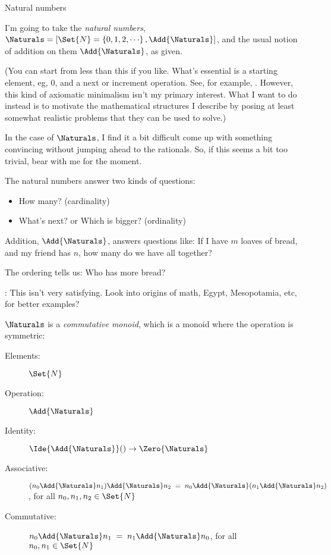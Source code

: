 \documentclass[12pt]{PalisadesLakesBook}
\begin{document}
\begin{plSection}{Natural numbers}

I'm going to take the \emph{natural numbers},
$\Naturals =
 [ \Set{N}=\left\{ 0, 1, 2, {\cdots}\right\}, \Add{\Naturals}]$,
and the usual notion of addition on them $\Add{\Naturals}$,
as given.

(You can start from less than this if you like.
What's essential is a starting element, eg, $0$,
and a {\pseudocodeFont next}
or {\pseudocodeFont increment} operation. 
See, for example, 
.
However, this kind of axiomatic minimalism 
isn't my primary interest.
What I want to do instead is to motivate the mathematical
structures I describe by posing at least somewhat realistic
problems that they can be used to solve.)

In the case of $\Naturals$, I find it a bit difficult 
come up with something convincing without
jumping ahead to the rationals.
So, if this seems a bit too trivial,
 bear with me for the moment.

The natural numbers answer two kinds of questions:
\begin{itemize}
\item How many? (cardinality)
\item What's next? or Which is bigger? (ordinality)
\end{itemize}

Addition, $\Add{\Naturals}$, answers questions like:
If I have $m$ loaves of bread,
and my friend has $n$, how many do we have all together?

The ordering tells us: Who has more bread?

\TODO: This isn't very satisfying.
Look into origins of math, Egypt, Mesopotamia, etc, for better
examples?

$\Naturals$ is a \emph{commutative monoid},
which is a monoid where the operation is symmetric:
\begin{description}
\item[Elements:] $\Set{N}$
\item[Operation:] $\Add{\Naturals}$
\item[Identity:] $\Ide{\Add{\Naturals}}() \rightarrow \Zero{\Naturals}$
\item[Associative:] 
$(n_0 \Add{\Naturals} n_1) \Add{\Naturals} n_2 \;=\;
n_0 \Add{\Naturals} (n_1 \Add{\Naturals} n_2)$, 
for all $n_0, n_1, n_2 \in \Set{N}$
\item[Commutative:] $n_0 \Add{\Naturals} n_1 \;=\;
n_1 \Add{\Naturals} n_0$,
for all $n_0, n_1 \in \Set{N}$
\end{description}


\end{plSection}
\end{document}
